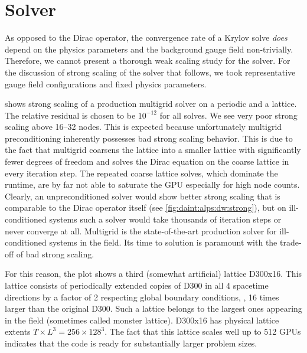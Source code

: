 
\section{Solver}
\label{sec:perf:solver}

As opposed to the Dirac operator, the convergence rate of a Krylov solve \emph{does} depend on the physics parameters and the background gauge field non-trivially.
Therefore, we cannot present a thorough weak scaling study for the solver.
For the discussion of strong scaling of the solver that follows, we took representative gauge field configurations and fixed physics parameters.

 shows strong scaling of a production multigrid solver on a periodic and a \Cstar lattice.
The relative residual is chosen to be $10^{-12}$ for all solves.
We see very poor strong scaling above \numrange{16}{32} nodes.
This is expected because unfortunately multigrid preconditioning inherently possesses bad strong scaling behavior.
This is due to the fact that multigrid coarsens the lattice into a smaller lattice with significantly fewer degrees of freedom and solves the Dirac equation on the coarse lattice in every iteration step.
The repeated coarse lattice solves, which dominate the runtime, are by far not able to saturate the GPU especially for high node counts.
Clearly, an unpreconditioned solver would show better strong scaling that is comparable to the Dirac operator itself (see \cref{fig:daint:alps:dw:strong}), but on ill-conditioned systems such a solver would take thousands of iteration steps or never converge at all.
Multigrid is the state-of-the-art production solver for ill-conditioned systems in the field.
Its time to solution is paramount with the trade-off of bad strong scaling.

For this reason, the plot shows a third (somewhat artificial) lattice D300x16.
This lattice consists of periodically extended copies of D300 in all \num{4} spacetime directions by a factor of \num{2} respecting global boundary conditions, \ie, \num{16} times larger than the original D300.
Such a lattice belongs to the largest ones appearing in the field (sometimes called monster lattice).
D300x16 has physical lattice extents $T \times L^{3} = 256 \times 128^{3}$.
The fact that this lattice scales well up to \num{512} GPUs indicates that the code is ready for substantially larger problem sizes.

